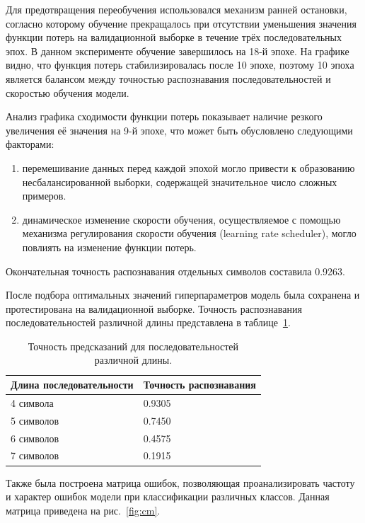 \documentclass{altsu-report}
\begin{document}
Для предотвращения переобучения использовался механизм ранней остановки, согласно которому обучение прекращалось при отсутствии уменьшения значения функции потерь на валидационной выборке в течение трёх последовательных эпох. В данном эксперименте обучение завершилось на 18-й эпохе. На графике видно, что функция потерь стабилизировалась после 10 эпохе, поэтому 10 эпоха является балансом между точностью распознавания последовательностей и скоростью обучения модели.

Анализ графика сходимости функции потерь показывает наличие резкого увеличения её значения на 9-й эпохе, что может быть обусловлено следующими факторами:

\begin{enumerate}
    \item перемешивание данных перед каждой эпохой могло привести к образованию несбалансированной выборки, содержащей значительное число сложных примеров.
    \item динамическое изменение скорости обучения, осуществляемое с помощью механизма регулирования скорости обучения (learning rate scheduler), могло повлиять на изменение функции потерь.
\end{enumerate}

Окончательная точность распознавания отдельных символов составила 0.9263.

После подбора оптимальных значений гиперпараметров модель была сохранена и протестирована на валидационной выборке. Точность распознавания последовательностей различной длины представлена в таблице~\ref{tab:probability}.

\begin{table}[H]
    \centering
    \caption{Точность предсказаний для последовательностей различной длины.}
    \begin{tabular}{|l|l|}
        \hline
        Длина последовательности & Точность распознавания \\
        \hline
        4 символа & 0.9305 \\
        \hline
        5 символов & 0.7450 \\
        \hline
        6 символов & 0.4575 \\
        \hline
        7 символов & 0.1915 \\
        \hline
    \end{tabular}
    \label{tab:probability}
\end{table}

Также была построена матрица ошибок, позволяющая проанализировать частоту и характер ошибок модели при классификации различных классов. Данная матрица приведена на рис.~\ref{fig:cm}.
\end{document}
